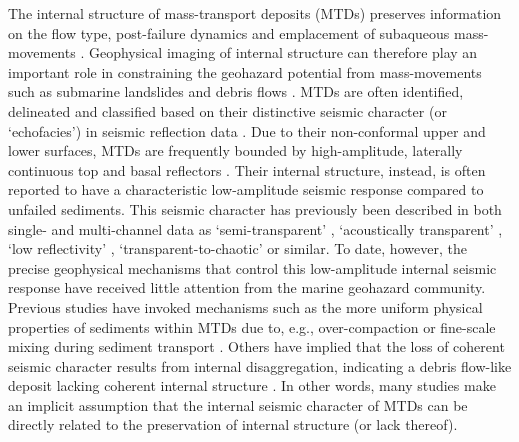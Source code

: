 \documentclass[se,manuscript]{copernicus}
\begin{document}
\introduction
\label{sec:introduction}

The internal structure of mass-transport deposits (MTDs) preserves information on the flow type, post-failure dynamics and emplacement of subaqueous mass-movements \citep{mulder_classification_1996,lucente_anatomy_2003,lamarche_meso-scale_2016,sobiesiak_internal_2016}.
Geophysical imaging of internal structure can therefore play an important role in constraining the geohazard potential from mass-movements such as submarine landslides and debris flows \citep[e.g.,][]{strasser_slumping_2011,pini_et_al_2012,ogata_geophysical-geochemical_2019,karstens_gradual_2019}.
MTDs are often identified, delineated and classified based on their distinctive seismic character (or `echofacies') in seismic reflection data \citep{moscardelli_new_2008,alves_assessing_2014,clare2018}.
Due to their non-conformal upper and lower surfaces, MTDs are frequently bounded by high-amplitude, laterally continuous top and basal reflectors \citep{martinez_3d_2005}.
Their internal structure, instead, is often reported to have a characteristic low-amplitude seismic response compared to unfailed sediments.
This seismic character has previously been described in both single- and multi-channel data as {`semi-transparent'} \citep{piper1997mass,moernaut_evaluating_2020}, `acoustically transparent' \citep{talling_how_2010,hunt_submarine_2021}, `low reflectivity' \citep{sawyer_retrogressive_2009}, `transparent-to-chaotic' \citep{posamentier2011character} or similar.
To date, however, the precise geophysical mechanisms that control this low-amplitude internal seismic response have received little attention from the marine geohazard community.
Previous studies have invoked mechanisms such as the more uniform physical properties of sediments within MTDs due to, e.g., over-compaction or fine-scale mixing during sediment transport \citep{posamentier_seismic_2003,shipp_physical_2004,sawyer_retrogressive_2009}.
Others have implied that the loss of coherent seismic character results from internal disaggregation, indicating a debris flow-like deposit lacking coherent internal structure \citep[e.g.,][]{diviacco_late_2006,hunt_submarine_2021}.
In other words, many studies make an implicit assumption that the internal seismic character of MTDs can be directly related to the preservation of internal structure (or lack thereof).
\end{document}
